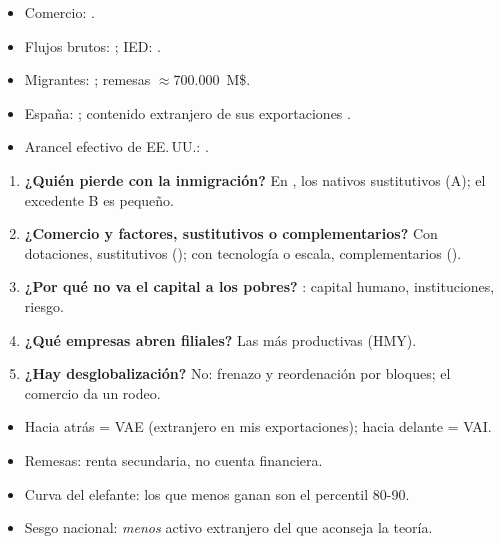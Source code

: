 \documentclass{article}
\begin{document}
\begin{columnas}
\anexorepaso
{}
\begin{itemize}
\item Comercio: .
\item Flujos brutos: ; IED: .
\item Migrantes: ; remesas $\approx$700.000~M\$.
\item España: ; contenido extranjero de sus exportaciones .
\item Arancel efectivo de EE.\,UU.: .
\end{itemize}
\begin{enumerate}
\item \textbf{¿Quién pierde con la inmigración?} En , los nativos sustitutivos (A); el excedente B es pequeño.
\item \textbf{¿Comercio y factores, sustitutivos o complementarios?} Con dotaciones, sustitutivos (); con tecnología o escala, complementarios ().
\item \textbf{¿Por qué no va el capital a los pobres?} : capital humano, instituciones, riesgo.
\item \textbf{¿Qué empresas abren filiales?} Las más productivas (HMY).
\item \textbf{¿Hay desglobalización?} No: frenazo y reordenación por bloques; el comercio da un rodeo.
\end{enumerate}
\begin{trampa}
\begin{itemize}
\item Hacia atrás = VAE (extranjero en mis exportaciones); hacia delante = VAI.
\item Remesas: renta secundaria, no cuenta financiera.
\item Curva del elefante: los que menos ganan son el percentil 80-90.
\item Sesgo nacional: \emph{menos} activo extranjero del que aconseja la teoría.
\end{itemize}
\end{trampa}

\end{columnas}
\end{document}
